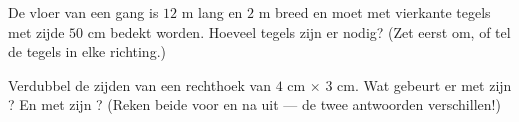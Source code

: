 \begin{exercise}[$\star\star$]\label{exo:g5:areas:10}
De vloer van een gang is $12$ m lang en $2$ m breed en moet met vierkante
tegels met zijde $50$ cm bedekt worden. Hoeveel tegels zijn er nodig? (Zet
eerst om, of tel de tegels in elke richting.)
\end{exercise}

\begin{exercise}[$\star\star$]\label{exo:g5:areas:11}
Verdubbel de zijden van een rechthoek van $4$ cm $\times$ $3$ cm. Wat gebeurt
er met zijn ? En met zijn ? (Reken beide voor en na uit ---
de twee antwoorden verschillen!)
\end{exercise}
